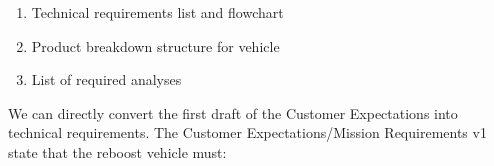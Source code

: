 \documentclass[onecolumn,10pt]{jhwhw}
\author{John Karasinski}
\title{}
\begin{document}

\begin{enumerate}
\item Technical requirements list and flowchart
\item Product breakdown structure for vehicle
\item List of required analyses \\
\end{enumerate}

\noindent We can directly convert the first draft of the Customer Expectations into technical requirements. The Customer Expectations/Mission Requirements v1 state that the reboost vehicle must:\\
\end{document}
